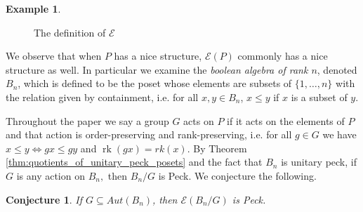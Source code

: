 \documentclass[10 pt]{amsart}
\theoremstyle{plain}
\newtheorem{conjecture}[thm]{Conjecture}
\theoremstyle{definition}
\newtheorem{eg}[thm]{Example}
\theoremstyle{remark}
\numberwithin{equation}{section}
\newcommand\rk{\operatorname{rk}}
\renewcommand{\iff}{\Leftrightarrow}
\begin{document}
\begin{eg}
\begin{figure}[h!]
\begin{center}
\iffalse
\newline
\begin{tikzpicture}[scale=.7]
  \node (one) at (90:2cm) {$6$};
  \node (b) at (150:2cm) {$4$};
  \node (a) at (210:2cm) {$2$};
  \node (zero) at (270:2cm) {$1$};
  \node (c) at (330:2cm) {$3$};
  \node (d) at (30:2cm) {$5$};
  \draw (zero) -- (a) -- (b) -- (one) -- (d) -- (c) -- (zero);
\end{tikzpicture}
\begin{tikzpicture}[scale=.7]
  \node (one) at (60:2cm) {$(5, 6)$};
  \node (b) at (120:2cm) {$(4, 6)$};
  \node (a) at (180:2cm) {$(2, 4)$};
  \node (zero) at (240:2cm) {$(1, 2)$};
  \node (c) at (300:2cm) {$(1,3)$};
  \node (d) at (0:2cm) {$(3, 5)$};
  \draw (zero) -- (a) -- (b);
  \draw (c)--(d)--(one);
\end{tikzpicture}
\begin{tikzpicture}[scale=.7]
  \node (one) at (60:2cm) {$(5, 6)$};
  \node (b) at (120:2cm) {$(4, 6)$};
  \node (a) at (180:2cm) {$(2, 4)$};
  \node (zero) at (240:2cm) {$(1, 2)$};
  \node (c) at (300:2cm) {$(1, 3)$};
  \node (d) at (0:2cm) {$(3, 5)$};
  \draw (zero) -- (a) -- (b) -- (c)--(d)--(one) -- (zero);
\end{tikzpicture}
\fi
\caption{\label{fig:EP_definition_example}The definition of $\mathcal E$}
\end{center}
\end{figure}
\end{eg}


We observe that when $P$ has a nice structure, $\mathcal E(P)$ commonly has a nice structure as well.  In particular we examine the \textit{boolean algebra of rank $n$}, denoted $B_n$, which is defined to be the poset whose elements are subsets of $\{1,\ldots,n\}$ with the relation given by containment, i.e. for all $x,y\in B_n$, $x\le y$ if $x$ is a subset of $y$.

Throughout the paper we say a group $G$ acts on $P$ if it acts on the elements of $P$ and that action is order-preserving and rank-preserving, i.e. for all $g \in G$ we have $x \leq y \iff gx \leq gy$ and $\rk(gx) = rk(x)$.  By Theorem \ref{thm:quotients_of_unitary_peck_posets} and the fact that $B_n$ is unitary peck, if $G$ is any action on $B_n,$ then $B_n/G$ is Peck.  We conjecture the following.

\begin{conjecture}\label{conj:F_of_BnG_Peck}
If $G \subseteq Aut(B_n)$, then $\mathcal E(B_n/G)$ is Peck.
\end{conjecture}
\end{document}
